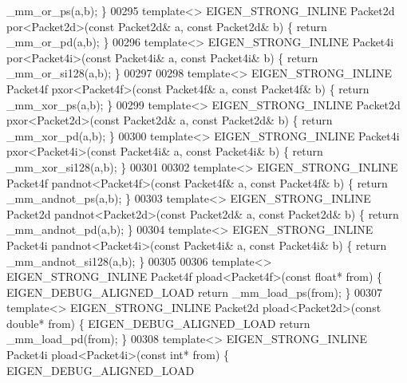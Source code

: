 \begin{DoxyCode}
      \_mm\_or\_ps(a,b); \}
00295 \textcolor{keyword}{template}<> EIGEN\_STRONG\_INLINE Packet2d por<Packet2d>(\textcolor{keyword}{const} Packet2d& a, \textcolor{keyword}{const} Packet2d& b) \{ \textcolor{keywordflow}{return} 
      \_mm\_or\_pd(a,b); \}
00296 \textcolor{keyword}{template}<> EIGEN\_STRONG\_INLINE Packet4i por<Packet4i>(\textcolor{keyword}{const} Packet4i& a, \textcolor{keyword}{const} Packet4i& b) \{ \textcolor{keywordflow}{return} 
      \_mm\_or\_si128(a,b); \}
00297 
00298 \textcolor{keyword}{template}<> EIGEN\_STRONG\_INLINE Packet4f pxor<Packet4f>(\textcolor{keyword}{const} Packet4f& a, \textcolor{keyword}{const} Packet4f& b) \{ \textcolor{keywordflow}{return} 
      \_mm\_xor\_ps(a,b); \}
00299 \textcolor{keyword}{template}<> EIGEN\_STRONG\_INLINE Packet2d pxor<Packet2d>(\textcolor{keyword}{const} Packet2d& a, \textcolor{keyword}{const} Packet2d& b) \{ \textcolor{keywordflow}{return} 
      \_mm\_xor\_pd(a,b); \}
00300 \textcolor{keyword}{template}<> EIGEN\_STRONG\_INLINE Packet4i pxor<Packet4i>(\textcolor{keyword}{const} Packet4i& a, \textcolor{keyword}{const} Packet4i& b) \{ \textcolor{keywordflow}{return} 
      \_mm\_xor\_si128(a,b); \}
00301 
00302 \textcolor{keyword}{template}<> EIGEN\_STRONG\_INLINE Packet4f pandnot<Packet4f>(\textcolor{keyword}{const} Packet4f& a, \textcolor{keyword}{const} Packet4f& b) \{ \textcolor{keywordflow}{return} 
      \_mm\_andnot\_ps(a,b); \}
00303 \textcolor{keyword}{template}<> EIGEN\_STRONG\_INLINE Packet2d pandnot<Packet2d>(\textcolor{keyword}{const} Packet2d& a, \textcolor{keyword}{const} Packet2d& b) \{ \textcolor{keywordflow}{return} 
      \_mm\_andnot\_pd(a,b); \}
00304 \textcolor{keyword}{template}<> EIGEN\_STRONG\_INLINE Packet4i pandnot<Packet4i>(\textcolor{keyword}{const} Packet4i& a, \textcolor{keyword}{const} Packet4i& b) \{ \textcolor{keywordflow}{return} 
      \_mm\_andnot\_si128(a,b); \}
00305 
00306 \textcolor{keyword}{template}<> EIGEN\_STRONG\_INLINE Packet4f pload<Packet4f>(\textcolor{keyword}{const} \textcolor{keywordtype}{float}*   from) \{ EIGEN\_DEBUG\_ALIGNED\_LOAD \textcolor{keywordflow}{
      return} \_mm\_load\_ps(from); \}
00307 \textcolor{keyword}{template}<> EIGEN\_STRONG\_INLINE Packet2d pload<Packet2d>(\textcolor{keyword}{const} \textcolor{keywordtype}{double}*  from) \{ EIGEN\_DEBUG\_ALIGNED\_LOAD \textcolor{keywordflow}{
      return} \_mm\_load\_pd(from); \}
00308 \textcolor{keyword}{template}<> EIGEN\_STRONG\_INLINE Packet4i pload<Packet4i>(\textcolor{keyword}{const} \textcolor{keywordtype}{int}*     from) \{ EIGEN\_DEBUG\_ALIGNED\_LOAD \textcolor{keywordflow}{
}
\end{DoxyCode}
